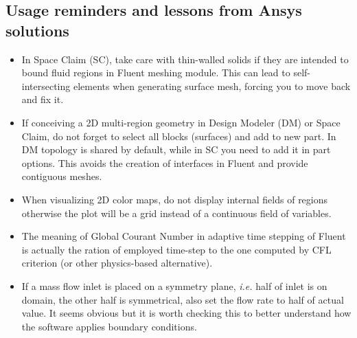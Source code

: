 \subsection{Usage reminders and lessons from Ansys solutions}

\begin{itemize}
\item In Space Claim (SC), take care with thin-walled solids if they are intended to bound fluid regions in Fluent meshing module. This can lead to self-intersecting elements when generating surface mesh, forcing you to move back and fix it.
\item If conceiving a 2D multi-region geometry in Design Modeler (DM) or Space Claim, do not forget to select all blocks (surfaces) and add to new part. In DM topology is shared by default, while in SC you need to add it in part options. This avoids the creation of interfaces in Fluent and provide contiguous meshes.
\item When visualizing 2D color maps, do not display internal fields of regions otherwise the plot will be a grid instead of a continuous field of variables.
\item The meaning of Global Courant Number in adaptive time stepping of Fluent is actually the ration of employed time-step to the one computed by CFL criterion (or other physics-based alternative).
\item If a mass flow inlet is placed on a symmetry plane, \emph{i.e.} half of inlet is on domain, the other half is symmetrical, also set the flow rate to half of actual value. It seems obvious but it is worth checking this to better understand how the software applies boundary conditions.
\end{itemize}